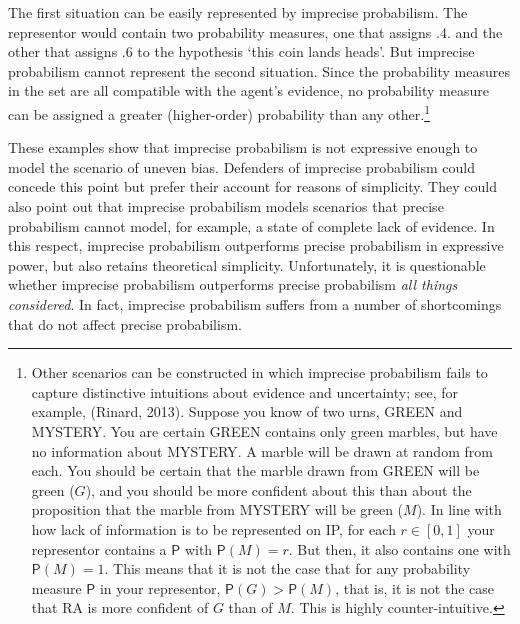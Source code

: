 \documentclass[
  letterpaper,
  DIV=11,
  numbers=noendperiod]{scrartcl}
\newcommand{\pr}[1]{\mathsf{P}(#1)}
\begin{document}
\noindent The first situation can be easily represented by imprecise
probabilism. The representor would contain two probability measures, one
that assigns .4. and the other that assigns .6 to the hypothesis `this
coin lands heads'. But imprecise probabilism cannot represent the second
situation. Since the probability measures in the set are all compatible
with the agent's evidence, no probability measure can be assigned a
greater (higher-order) probability than any other.\footnote{Other
  scenarios can be constructed in which imprecise probabilism fails to
  capture distinctive intuitions about evidence and uncertainty; see,
  for example, (Rinard, 2013). Suppose you know of two urns,
  \textsf{GREEN} and \textsf{MYSTERY}. You are certain \textsf{GREEN}
  contains only green marbles, but have no information about
  \textsf{MYSTERY}. A marble will be drawn at random from each. You
  should be certain that the marble drawn from \textsf{GREEN} will be
  green (\(G\)), and you should be more confident about this than about
  the proposition that the marble from \textsf{MYSTERY} will be green
  (\(M\)). In line with how lack of information is to be represented on
  \textsf{IP}, for each \(r\in [0,1]\) your representor contains a
  \(\mathsf{P}\) with \(\pr{M}=r\). But then, it also contains one with
  \(\pr{M}=1\). This means that it is not the case that for any
  probability measure \(\mathsf{P}\) in your representor,
  \(\mathsf{P}(G) > \mathsf{P}(M)\), that is, it is not the case that RA
  is more confident of \(G\) than of \(M\). This is highly
  counter-intuitive.}

These examples show that imprecise probabilism is not expressive enough
to model the scenario of uneven bias. Defenders of imprecise probabilism
could concede this point but prefer their account for reasons of
simplicity. They could also point out that imprecise probabilism models
scenarios that precise probabilism cannot model, for example, a state of
complete lack of evidence. In this respect, imprecise probabilism
outperforms precise probabilism in expressive power, but also retains
theoretical simplicity. Unfortunately, it is questionable whether
imprecise probabilism outperforms precise probabilism \emph{all things
considered}. In fact, imprecise probabilism suffers from a number of
shortcomings that do not affect precise probabilism.
\end{document}
